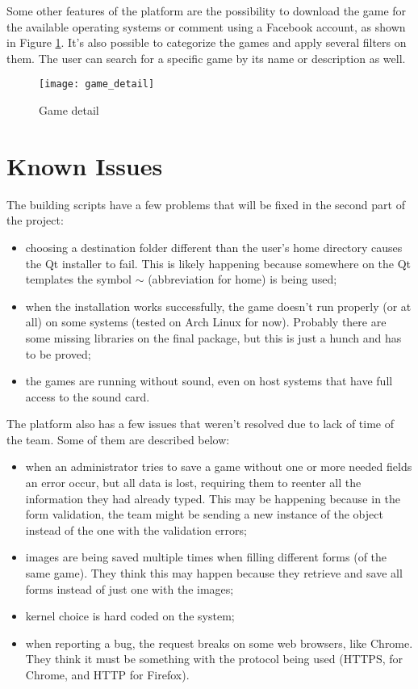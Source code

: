 Some other features of the platform are the possibility to download the game for the available operating systems or comment using a Facebook account, as shown in Figure \ref{fig:game_detail}. It's also possible to categorize the games and apply several filters on them. The user can search for a specific game by its name or description as well.


\begin{figure}[h!]
\centering
\texttt{[image: game\_detail]}
\caption{Game detail}
\label {fig:game_detail}
\end{figure}

\section{Known Issues}
\label {sec:issues}

The building scripts have a few problems that will be fixed in the second part of the project:

\begin{itemize}
\item choosing a destination folder different than the user's home directory causes the Qt installer to fail. This is likely happening because somewhere on the Qt templates the symbol $\sim$ (abbreviation for home) is being used;

\item when the installation works successfully, the game doesn't run properly (or at all) on some systems (tested on Arch Linux for now). Probably there are some missing libraries on the final package, but this is just a hunch and has to be proved;

\item the games are running without sound, even on host systems that have full access to the sound card.
\end{itemize}

The platform also has a few issues that weren't resolved due to lack of time of the team. Some of them are described below:

\begin{itemize}
\item when an administrator tries to save a game without one or more needed fields an error occur, but all data is lost, requiring them to reenter all the information they had already typed. This may be happening because in the form validation, the team might be sending a new instance of the object instead of the one with the validation errors;

\item images are being saved multiple times when filling different forms (of the same game). They think this may happen because they retrieve and save all forms instead of just one with the images;

\item kernel choice is hard coded on the system;

\item when reporting a bug, the request breaks on some web browsers, like Chrome. They think it must be something with the protocol being used (HTTPS, for Chrome, and HTTP for Firefox).
\end{itemize}
